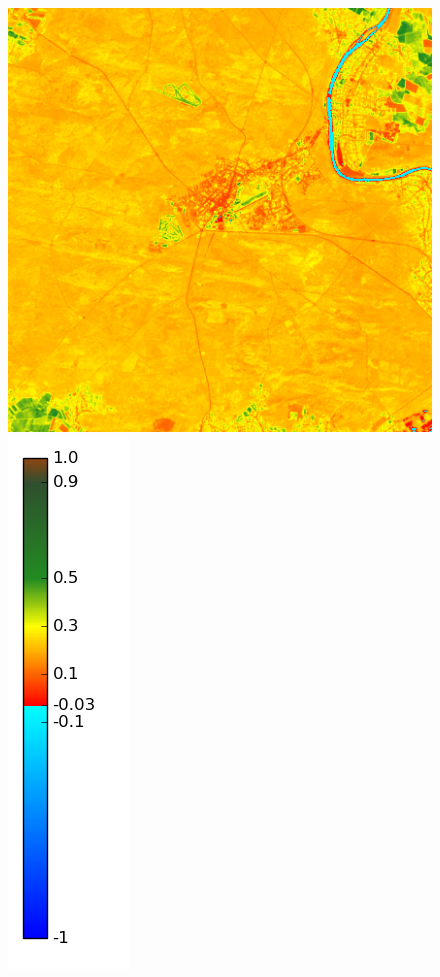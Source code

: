 \documentclass{book}
\begin{document}
\begin{figure}[H]
{\includegraphics[scale=0.25]{images/Fontainebleau/04_ndvi.png}
\includegraphics[scale=0.2]{images/colormap.png}
}
\end{figure}
\end{document}
